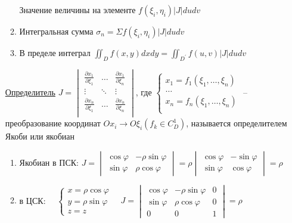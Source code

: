 \documentclass[12pt]{article}
\begin{document}
\begin{enumerate}
\begin{enumerate}
            Значение величины на элементе $f(\xi_i, \eta_i) |J| du dv$
            \item Интегральная сумма $\sigma_n = \Sigma f(\xi_i, \eta_i) |J| du dv$
            \item В пределе интеграл $\iint_D f(x, y) dx dy = \iint_{D^\prime} f(u, v) |J| du dv$
        \end{enumerate}

        \hyperlink{determinantJaсobi}{Определитель}
        $J = \begin{vmatrix}
            \frac{\partial x_1}{\partial \xi_1} & \dots  & \frac{\partial x_1}{\partial \xi_n} \\
            \vdots & \ddots & \vdots \\
            \frac{\partial x_n}{\partial \xi_1} & \dots & \frac{\partial x_n}{\partial \xi_n} \\
        \end{vmatrix}$, где $\begin{cases}
            x_1 = f_1(\xi_1, \dots, \xi_n) \\
            \dots \\
            x_n = f_n(\xi_1, \dots, \xi_n) \\
        \end{cases}$ -- преобразование координат $Ox_i \to O\xi_i (f_k \in C^1_D)$,
        называется определителем Якоби или якобиан

        \begin{enumerate}
            \item Якобиан в ПСК: $J = \begin{vmatrix}\cos\varphi & -\rho\sin\varphi \\ \sin\varphi & \rho\cos\varphi\end{vmatrix} =
            \rho \begin{vmatrix}\cos\varphi & -\sin\varphi \\ \sin\varphi & \cos\varphi\end{vmatrix} = \rho$

            \item в ЦСК: $\quad \begin{cases}
                x = \rho\cos\varphi \\ y = \rho\sin\varphi \\ z = z
            \end{cases} \quad J = \begin{vmatrix}\cos\varphi & -\rho\sin\varphi & 0 \\ \sin\varphi & \rho\cos\varphi & 0 \\ 0 & 0 & 1\end{vmatrix} = \rho$
        \end{enumerate}


\end{enumerate}
\end{document}
